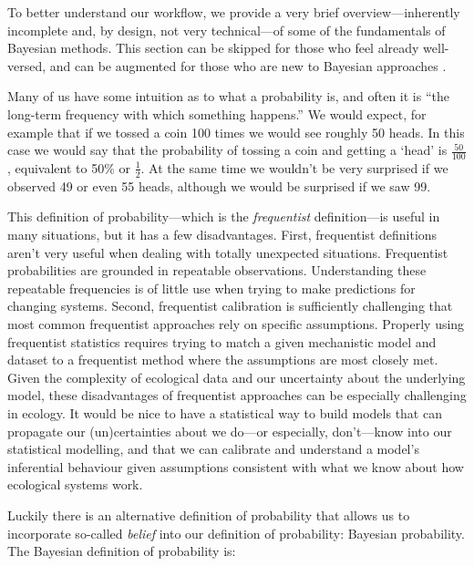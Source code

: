 \documentclass[11pt]{article}
\begin{document}
{To better understand our workflow, we provide a very brief overview---inherently incomplete and, by design, not very technical---of some of the fundamentals of Bayesian methods. This section can be skipped for those who feel already well-versed, and can be augmented for those who are new to Bayesian approaches \citep[for example,][]{statrethink,BDA,regotherstories}.

Many of us have some intuition as to what a probability is, and often it is ``the long-term frequency with which something happens.'' We would expect, for example that if we tossed a coin 100 times we would see roughly 50 heads.  In this case we would say that the probability of tossing a coin and getting a `head' is $\frac{50}{100}$, equivalent to 50\% or $\frac{1}{2}$. At the same time we wouldn’t be very surprised if we observed 49 or even 55 heads, although we would be surprised if we saw 99.

This definition of probability---which is the \emph{frequentist} definition---is useful in many situations, but it has a few disadvantages. First, frequentist definitions aren't very useful when dealing with totally unexpected situations. Frequentist probabilities are grounded in repeatable observations. Understanding these repeatable frequencies is of little use when trying to make predictions for changing systems. Second, frequentist calibration is sufficiently challenging that most common frequentist approaches rely on specific assumptions. Properly using frequentist statistics requires trying to match a given mechanistic model and dataset to a frequentist method where the assumptions are most closely met. Given the complexity of ecological data and our uncertainty about the underlying model, these disadvantages of frequentist approaches can be especially challenging in ecology. It would be nice to have a statistical way to build models that can propagate our (un)certainties about we do---or especially, don't---know into our statistical modelling, and that we can calibrate and understand a model's inferential behaviour given assumptions consistent with what we know about how ecological systems work. %

Luckily there is an alternative definition of probability that allows us to incorporate so-called \emph{belief} into our definition of probability: Bayesian probability. The Bayesian definition of probability is:

}
\end{document}
